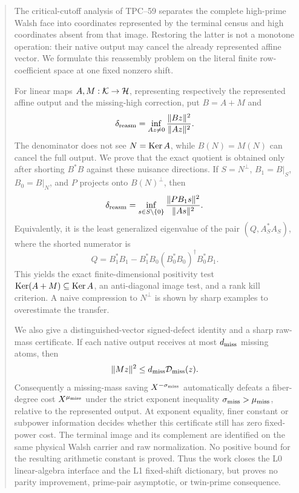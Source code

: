 \begin{abstract}
The critical-cutoff analysis of TPC--59 separates the complete high-prime
Walsh face into coordinates represented by the terminal census and
high coordinates absent from that image.  Restoring the latter is not a
monotone operation: their native output may cancel the already represented
affine vector.  We formulate this reassembly problem on the literal finite
row-coefficient space at one fixed nonzero shift.

For linear maps \(A,M:\cK\to\cH\), representing respectively the
represented affine output and the missing-high correction, put \(B=A+M\)
and
\[
 \delta_{\rm reasm}
 =\inf_{Az\ne0}\frac{\|Bz\|^2}{\|Az\|^2}.
\]
The denominator does not see \(N=\Ker A\), while \(B(N)=M(N)\) can cancel
the full output.  We prove that the exact quotient is obtained only after
shorting \(B^*B\) against these nuisance directions.  If \(S=N^\perp\),
\(B_1=B|_S\), \(B_0=B|_N\), and \(P\) projects onto
\(B(N)^\perp\), then
\[
 \delta_{\rm reasm}
 =\inf_{s\in S\setminus\{0\}}
   \frac{\|PB_1s\|^2}{\|A s\|^2}.
\]
Equivalently, it is the least generalized eigenvalue of the pair
\((Q,A_S^*A_S)\), where the shorted numerator is
\[
 Q=B_1^*B_1-B_1^*B_0(B_0^*B_0)^\dagger B_0^*B_1.
\]
This yields the exact finite-dimensional positivity test
\(\Ker(A+M)\subseteq\Ker A\), an anti-diagonal image test, and a rank
kill criterion.  A naive compression to \(N^\perp\) is shown by sharp
examples to overestimate the transfer.

We also give a distinguished-vector signed-defect identity and a sharp
raw-mass certificate.  If each native output receives at most
\(d_{\rm miss}\) missing atoms, then
\[
 \|Mz\|^2\le d_{\rm miss}\cD_{\rm miss}(z).
\]
Consequently a missing-mass saving \(X^{-\sigma_{\rm miss}}\)
automatically defeats a fiber-degree cost \(X^{\mu_{\rm miss}}\) under
the strict exponent inequality
\(\sigma_{\rm miss}>\mu_{\rm miss}\), relative to the represented
output.  At exponent equality, finer constant or subpower information
decides whether this certificate still has zero fixed-power cost.
The terminal image and its complement are identified on the same physical
Walsh carrier and raw normalization.  No positive bound for the resulting
arithmetic constant is proved.  Thus the work closes the L0 linear-algebra
interface and the L1 fixed-shift dictionary, but proves no parity
improvement, prime-pair asymptotic, or twin-prime consequence.
\end{abstract}
